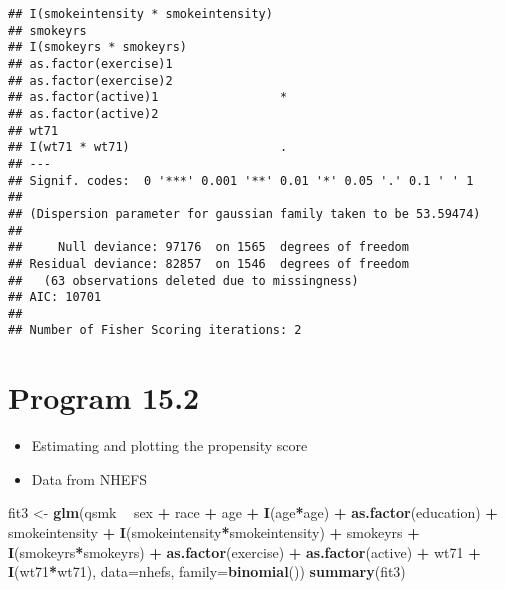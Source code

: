 \documentclass[10pt,]{book}
\newenvironment{Shaded}{\begin{snugshade}}{\end{snugshade}}
\newcommand{\DataTypeTok}[1]{\textcolor[rgb]{0.13,0.29,0.53}{#1}}
\newcommand{\KeywordTok}[1]{\textcolor[rgb]{0.13,0.29,0.53}{\textbf{#1}}}
\newcommand{\NormalTok}[1]{#1}
\newcommand{\OperatorTok}[1]{\textcolor[rgb]{0.81,0.36,0.00}{\textbf{#1}}}
\newcommand{\StringTok}[1]{\textcolor[rgb]{0.31,0.60,0.02}{#1}}
\providecommand{\tightlist}{%
  \setlength{\itemsep}{0pt}\setlength{\parskip}{0pt}}
\begin{document}
\begin{verbatim}
## I(smokeintensity * smokeintensity)    
## smokeyrs                              
## I(smokeyrs * smokeyrs)                
## as.factor(exercise)1                  
## as.factor(exercise)2                  
## as.factor(active)1                 *  
## as.factor(active)2                    
## wt71                                  
## I(wt71 * wt71)                     .  
## ---
## Signif. codes:  0 '***' 0.001 '**' 0.01 '*' 0.05 '.' 0.1 ' ' 1
## 
## (Dispersion parameter for gaussian family taken to be 53.59474)
## 
##     Null deviance: 97176  on 1565  degrees of freedom
## Residual deviance: 82857  on 1546  degrees of freedom
##   (63 observations deleted due to missingness)
## AIC: 10701
## 
## Number of Fisher Scoring iterations: 2
\end{verbatim}

\hypertarget{program-15.2}{%
\section{Program 15.2}\label{program-15.2}}

\begin{itemize}
\tightlist
\item
  Estimating and plotting the propensity score
\item
  Data from NHEFS
\end{itemize}

\begin{Shaded}
\begin{Highlighting}[]
\NormalTok{fit3 <-}\StringTok{ }\KeywordTok{glm}\NormalTok{(qsmk }\OperatorTok{~}\StringTok{ }\NormalTok{sex }\OperatorTok{+}\StringTok{ }\NormalTok{race }\OperatorTok{+}\StringTok{ }\NormalTok{age }\OperatorTok{+}\StringTok{ }\KeywordTok{I}\NormalTok{(age}\OperatorTok{*}\NormalTok{age) }\OperatorTok{+}\StringTok{ }\KeywordTok{as.factor}\NormalTok{(education)}
            \OperatorTok{+}\StringTok{ }\NormalTok{smokeintensity }\OperatorTok{+}\StringTok{ }\KeywordTok{I}\NormalTok{(smokeintensity}\OperatorTok{*}\NormalTok{smokeintensity) }\OperatorTok{+}\StringTok{ }\NormalTok{smokeyrs}
            \OperatorTok{+}\StringTok{ }\KeywordTok{I}\NormalTok{(smokeyrs}\OperatorTok{*}\NormalTok{smokeyrs) }\OperatorTok{+}\StringTok{ }\KeywordTok{as.factor}\NormalTok{(exercise) }\OperatorTok{+}\StringTok{ }\KeywordTok{as.factor}\NormalTok{(active)}
            \OperatorTok{+}\StringTok{ }\NormalTok{wt71 }\OperatorTok{+}\StringTok{ }\KeywordTok{I}\NormalTok{(wt71}\OperatorTok{*}\NormalTok{wt71), }\DataTypeTok{data=}\NormalTok{nhefs, }\DataTypeTok{family=}\KeywordTok{binomial}\NormalTok{())}
\KeywordTok{summary}\NormalTok{(fit3)}
\end{Highlighting}
\end{Shaded}
\end{document}
